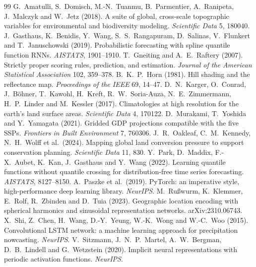 \documentclass[11pt,a4paper]{article}
\begin{document}
\begin{thebibliography}{99}
G.~Amatulli, S.~Domisch, M.-N.~Tuanmu, B.~Parmentier, A.~Ranipeta, J.~Malczyk and W.~Jetz (2018).
A suite of global, cross-scale topographic variables for environmental and biodiversity modeling.
\emph{Scientific Data} 5, 180040.
J.~Gasthaus, K.~Benidis, Y.~Wang, S.~S.~Rangapuram, D.~Salinas, V.~Flunkert and T.~Januschowski
(2019). Probabilistic forecasting with spline quantile function RNNs. \emph{AISTATS}, 1901--1910.
T.~Gneiting and A.~E.~Raftery (2007). Strictly proper scoring rules, prediction, and estimation.
\emph{Journal of the American Statistical Association} 102, 359--378.
B.~K.~P.~Horn (1981). Hill shading and the reflectance map. \emph{Proceedings of the IEEE} 69,
14--47.
D.~N.~Karger, O.~Conrad, J.~B\"ohner, T.~Kawohl, H.~Kreft, R.~W.~Soria-Auza, N.~E.~Zimmermann,
H.~P.~Linder and M.~Kessler (2017). Climatologies at high resolution for the earth's land surface
areas. \emph{Scientific Data} 4, 170122.
D.~Murakami, T.~Yoshida and Y.~Yamagata (2021). Gridded GDP projections compatible with the five
SSPs. \emph{Frontiers in Built Environment} 7, 760306.
J.~R.~Oakleaf, C.~M.~Kennedy, N.~H.~Wolff et al.\ (2024). Mapping global land conversion pressure
to support conservation planning. \emph{Scientific Data} 11, 830.
Y.~Park, D.~Maddix, F.-X.~Aubet, K.~Kan, J.~Gasthaus and Y.~Wang (2022). Learning quantile
functions without quantile crossing for distribution-free time series forecasting.
\emph{AISTATS}, 8127--8150.
A.~Paszke et al.\ (2019). PyTorch: an imperative style, high-performance deep learning library.
\emph{NeurIPS}.
M.~Ru{\ss}wurm, K.~Klemmer, E.~Rolf, R.~Zbinden and D.~Tuia (2023). Geographic location encoding
with spherical harmonics and sinusoidal representation networks. arXiv:2310.06743.
X.~Shi, Z.~Chen, H.~Wang, D.-Y.~Yeung, W.-K.~Wong and W.-C.~Woo (2015). Convolutional LSTM
network: a machine learning approach for precipitation nowcasting. \emph{NeurIPS}.
V.~Sitzmann, J.~N.~P.~Martel, A.~W.~Bergman, D.~B.~Lindell and G.~Wetzstein (2020). Implicit
neural representations with periodic activation functions. \emph{NeurIPS}.

\end{thebibliography}
\end{document}
